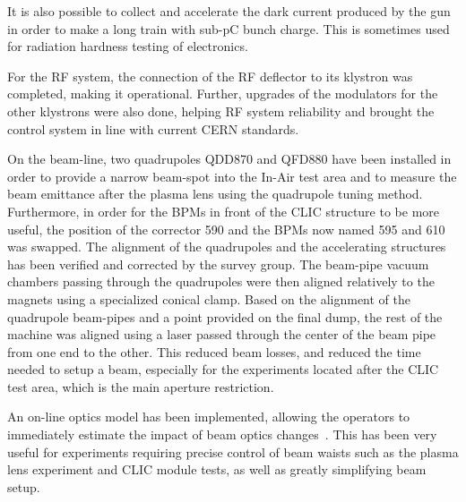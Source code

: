 \documentclass[a4paper,
               keeplastbox,   %
               ]{jacow}
\begin{document}
It is also possible to collect and accelerate the dark current produced by the gun in order to make a long train with sub-pC bunch charge.
This is sometimes used for radiation hardness testing of electronics.

For the RF system, the connection of the RF deflector to its klystron was completed, making it operational.
Further, upgrades of the modulators for the other klystrons were also done, helping RF system reliability and brought the control system in line with current CERN standards.


On the beam-line, two quadrupoles QDD870 and QFD880 have been installed in order to provide a narrow beam-spot into the In-Air test area and to measure the beam emittance after the plasma lens using the quadrupole tuning method.
Furthermore, in order for the BPMs in front of the CLIC structure to be more useful, the position of the corrector 590 and the BPMs now named 595 and 610 was swapped.
The alignment of the quadrupoles and the accelerating structures has been verified and corrected by the survey group.
The beam-pipe vacuum chambers passing through the quadrupoles were then aligned relatively to the magnets using a specialized conical clamp.
Based on the alignment of the quadrupole beam-pipes and a point provided on the final dump, the rest of the machine was aligned using a laser passed through the center of the beam pipe from one end to the other.
This reduced beam losses, and reduced the time needed to setup a beam, especially for the experiments located after the CLIC test area, which is the main aperture restriction.


An on-line optics model has been implemented, allowing the operators to immediately estimate the impact of beam optics changes~\cite{Erik::CLEARrev}.
This has been very useful for experiments requiring precise control of beam waists such as the plasma lens experiment and CLIC module tests, as well as greatly simplifying beam setup.
\end{document}
